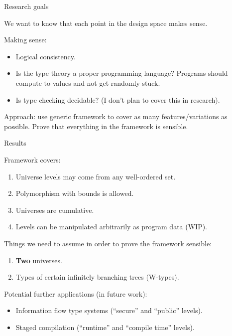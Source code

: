 \documentclass[dvipsnames,10pt,aspectratio=169]{beamer}
\begin{document}
\begin{frame}{Research goals}

We want to know that each point in the design space makes sense.
\vspace{1em}

Making sense:
\begin{itemize}
  \item Logical consistency.
  \item Is the type theory a proper programming language? Programs should compute to values
        and not get randomly stuck.
  \item Is type checking decidable? (I don't plan to cover this in research).
\end{itemize}

Approach: use generic framework to cover as many features/variations as
possible. Prove that everything in the framework is sensible.


\end{frame}


\begin{frame}{Results}

Framework covers:
\begin{enumerate}
  \item Universe levels may come from any well-ordered set.
  \item Polymorphism with bounds is allowed.
  \item Universes are cumulative.
  \item Levels can be manipulated arbitrarily as program data (WIP).
\end{enumerate}

Things we need to assume in order to prove the framework sensible:
\begin{enumerate}
  \item \textbf{Two} universes.
  \item Types of certain infinitely branching trees (W-types).
\end{enumerate}

Potential further applications (in future work):
\begin{itemize}
  \item Information flow type systems (``secure'' and ``public'' levels).
  \item Staged compilation (``runtime'' and ``compile time'' levels).
\end{itemize}

\end{frame}
\end{document}
